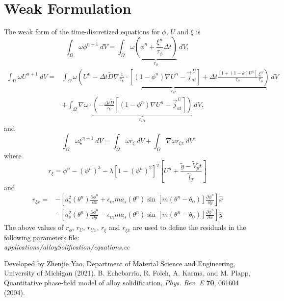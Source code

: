 \documentclass[10pt]{article}
\begin{document}
\section{Weak Formulation}
The weak form of the time-discretized equations for $\phi$, $U$ and $\xi$ is
\begin{equation}
\int_{\Omega}   \omega  \phi^{n+1}  ~dV = \int_{\Omega}   \omega \underbrace{\left(\phi^n + \frac{ \xi^n}{\tau_\phi}\Delta t\right)}_{r_{\phi}} ~dV,
\end{equation}
\begin{equation}
\begin{split}
\int_{\Omega}   \omega  U^{n+1}  ~dV =& 
\int_{\Omega} \omega \underbrace{ \left( U^{n} - \Delta t \tilde{D}\nabla \frac{1}{\tau_U} \cdot \left[(1-\phi^n)\nabla U^n-\vec{j}_{at}^{\,U}\right]+\Delta t \frac{[1+(1-k)U^n]}{\tau_U}\frac{\xi^n}{\tau_\phi} \right) }_{r_U}~dV\\
&+\int_{\Omega}  \nabla  \omega  \cdot \underbrace{\left( -\frac{\Delta t \tilde{D}}{\tau_U}\left[(1-\phi^n)\nabla U^n-\vec{j}_{at}^{\,U}\right] \right)}_{r_{Ux}}~dV,
\end{split}
\end{equation}
\newpage
and
\begin{equation}
\int_{\Omega}   \omega \xi^{n+1} ~dV =\int_{\Omega} \omega r_\xi ~dV + \int_{\Omega} \nabla \omega r_{\xi x} ~dV
\end{equation}
where
\begin{equation}
r_\xi= \phi^n-(\phi^n)^3 - \lambda \left[1-(\phi^n)^2\right]^2 \left[ U^n + \frac{\tilde{y}-\tilde{V}_p t}{\tilde{l}_T} \right]
\end{equation}
and 
\begin{equation}
\begin{split}
r_{\xi x}= &-\left[a_s^2(\theta^n) \frac{\partial \phi^n}{\partial x} + \epsilon_m m a_s(\theta^n) \sin \left[ m \left(\theta^n - \theta_0 \right) \right] \frac{\partial \phi^n}{\partial y}\right]\hat{x}\\
&-\left[a_s^2(\theta^n) \frac{\partial \phi^n}{\partial y} - \epsilon_m m a_s(\theta^n) \sin \left[ m \left(\theta^n - \theta_0 \right) \right] \frac{\partial \phi^n}{\partial x}\right]\hat{y}
\end{split}
\end{equation}
\vskip 0.25in
The above values of $r_{\phi}$, $r_{U}$, $r_{Ux}$,  $r_{\xi}$ and  $r_{\xi x}$ are used to define the residuals in the following parameters file: \\
\textit{applications/alloySolification/equations.cc}

\begin{thebibliography}{plain}
    Developed by Zhenjie Yao, Department of Material Science and Engineering, University of Michigan (2021).
     B. Echebarria, R. Folch, A. Karma, and M. Plapp, Quantitative phase-field model of alloy solidification, \emph{Phys. Rev. E} {\bf 70}, 061604 (2004).
\end{thebibliography}
\end{document}
